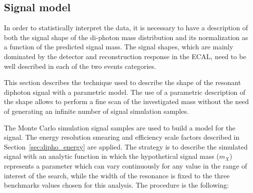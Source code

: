 \clearpage
\subsection{Signal model}

In order to statistically interpret the data, it is necessary to have a description of both the signal shape
of the di-photon mass distribution and its normalization as a function of the predicted signal mass.
The signal shapes, which are mainly dominated by the detector and reconstruction response in the ECAL,
need to be well described in each of the two events categories.

This section describes the technique used to describe the shape of the resonant diphoton signal with a parametric model. 
The use of a parametric description of the shape 
allows to perform a fine scan of the investigated mass without the need of generating an 
infinite number of signal simulation samples.

The Monte Carlo simulation signal samples are used to build a model for the signal.
The energy resolution smearing and efficiency scale factors 
described in Section~\ref{sec:dipho_energy} are applied.
The strategy is to describe the simulated signal with an analytic function in which the hypothetical signal mass ($m_{X}$)
represents a parameter which can vary continuously for any value in the range of interest of the search, while
the width of the resonance is fixed to the three benchmarks values chosen for this analysis.
The procedure is the following:


